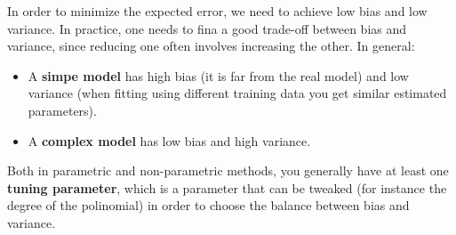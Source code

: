       In order to minimize the expected error, we need to achieve low bias and low variance. In practice, one needs to fina a good trade-off between bias and variance, since reducing one often involves increasing the other. In general:
      \begin{itemize}
        \item A \textbf{simpe model} has high bias (it is far from the real model) and low variance (when fitting using different training data you get similar estimated parameters).
        \item A \textbf{complex model} has low bias and high variance.
      \end{itemize}
      Both in parametric and non-parametric methods, you generally have at least one \textbf{tuning parameter}, which is a parameter that can be tweaked (for instance the degree of the polinomial) in order to choose the balance between bias and variance.
